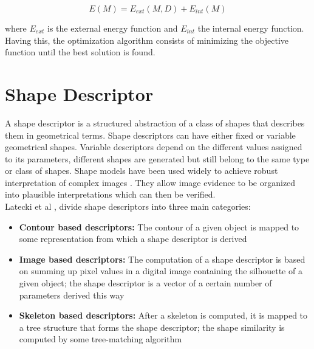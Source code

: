 $$E(M) = E_{ext}(M,D) + E_{int}(M)$$

where $E_{ext}$ is the external energy function and $E_{int}$ the 
internal energy function. 
Having this, the optimization algorithm consists of minimizing the objective
function until the best solution is found.


\section{Shape Descriptor}
\label{sec:shapedesc}

A shape descriptor is a structured abstraction of a class
of shapes that describes them in geometrical terms.
Shape descriptors can have either fixed or variable
geometrical shapes. Variable descriptors depend on the different values assigned to its
parameters, different shapes are generated but still belong to the same type or class of shapes.
Shape models have been used widely to achieve robust interpretation of complex
images \cite{wormparam}. They allow image evidence to be organized into plausible interpretations
which can then be verified.\\

Latecki et al \cite{shapenonrigid}, divide shape descriptors into three
main categories: 
\begin{itemize}
\item \textbf{Contour based descriptors: }The contour of a given object is 
mapped to some representation from which a shape descriptor is derived
\item \textbf{Image based descriptors: }The computation of a shape descriptor
is based on summing up pixel values in a digital image containing the silhouette
of a given object; the shape descriptor is a vector of a certain number of
parameters derived this way
\item \textbf{Skeleton based descriptors: }After a skeleton is computed, it is
mapped to a tree structure that forms the shape descriptor; the shape similarity
is computed by some tree-matching algorithm 
\end{itemize}

